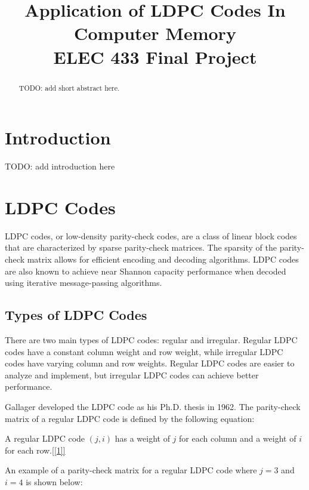 \documentclass[conference]{IEEEtran}
\begin{document}
\title{Application of LDPC Codes In Computer Memory\\
{\large ELEC 433 Final Project}
}

\author{
\and
{}
}

\maketitle

\begin{abstract}
  TODO: add short abstract here.
\end{abstract}

\section{Introduction}
TODO: add introduction here

\section{LDPC Codes}
LDPC codes, or low-density parity-check codes, are a class of linear block codes that are characterized by sparse parity-check matrices.
The sparsity of the parity-check matrix allows for efficient encoding and decoding algorithms.
LDPC codes are also known to achieve near Shannon capacity performance when decoded using iterative message-passing algorithms.

\subsection{Types of LDPC Codes}
There are two main types of LDPC codes: regular and irregular.
Regular LDPC codes have a constant column weight and row weight, while irregular LDPC codes have varying column and row weights.
Regular LDPC codes are easier to analyze and implement, but irregular LDPC codes can achieve better performance.

Gallager developed the LDPC code as his Ph.D. thesis in 1962.
The parity-check matrix of a regular LDPC code is defined by the following equation:

A regular LDPC code $(j,i)$ has a weight of $j$ for each column and a weight of $i$ for each row.\ref{[1]}

An example of a parity-check matrix for a regular LDPC code where $j=3$ and $i=4$ is shown below:
\end{document}
